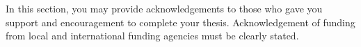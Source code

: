 In this section, you may provide acknowledgements to those who gave you support and encouragement to complete your thesis. Acknowledgement of funding from local and international funding agencies must be clearly stated.
